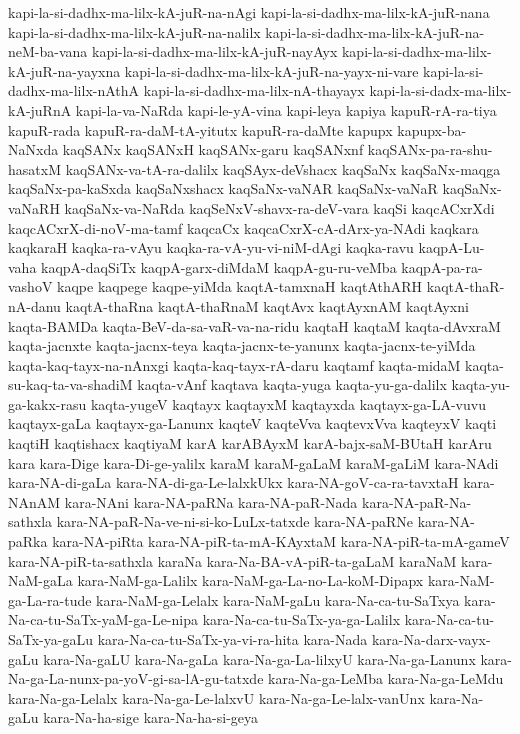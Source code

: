 {kapi-la-si-dadhx-ma-lilx-kA-juR-na-nAgi
kapi-la-si-dadhx-ma-lilx-kA-juR-nana
kapi-la-si-dadhx-ma-lilx-kA-juR-na-nalilx
kapi-la-si-dadhx-ma-lilx-kA-juR-na-neM-ba-vana
kapi-la-si-dadhx-ma-lilx-kA-juR-nayAyx
kapi-la-si-dadhx-ma-lilx-kA-juR-na-yayxna
kapi-la-si-dadhx-ma-lilx-kA-juR-na-yayx-ni-vare
kapi-la-si-dadhx-ma-lilx-nAthA
kapi-la-si-dadhx-ma-lilx-nA-thayayx
kapi-la-si-dadx-ma-lilx-kA-juRnA
kapi-la-va-NaRda
kapi-le-yA-vina
kapi-leya
kapiya
kapuR-rA-ra-tiya
kapuR-rada
kapuR-ra-daM-tA-yitutx
kapuR-ra-daMte
kapupx
kapupx-ba-NaNxda
kaqSANx
kaqSANxH
kaqSANx-garu
kaqSANxnf
kaqSANx-pa-ra-shu-hasatxM
kaqSANx-va-tA-ra-dalilx
kaqSAyx-deVshacx
kaqSaNx
kaqSaNx-maqga
kaqSaNx-pa-kaSxda
kaqSaNxshacx
kaqSaNx-vaNAR
kaqSaNx-vaNaR
kaqSaNx-vaNaRH
kaqSaNx-va-NaRda
kaqSeNxV-shavx-ra-deV-vara
kaqSi
kaqcACxrXdi
kaqcACxrX-di-noV-ma-tamf
kaqcaCx
kaqcaCxrX-cA-dArx-ya-NAdi
kaqkara
kaqkaraH
kaqka-ra-vAyu
kaqka-ra-vA-yu-vi-niM-dAgi
kaqka-ravu
kaqpA-Lu-vaha
kaqpA-daqSiTx
kaqpA-garx-diMdaM
kaqpA-gu-ru-veMba
kaqpA-pa-ra-vashoV
kaqpe
kaqpege
kaqpe-yiMda
kaqtA-tamxnaH
kaqtAthARH
kaqtA-thaR-nA-danu
kaqtA-thaRna
kaqtA-thaRnaM
kaqtAvx
kaqtAyxnAM
kaqtAyxni
kaqta-BAMDa
kaqta-BeV-da-sa-vaR-va-na-ridu
kaqtaH
kaqtaM
kaqta-dAvxraM
kaqta-jacnxte
kaqta-jacnx-teya
kaqta-jacnx-te-yanunx
kaqta-jacnx-te-yiMda
kaqta-kaq-tayx-na-nAnxgi
kaqta-kaq-tayx-rA-daru
kaqtamf
kaqta-midaM
kaqta-su-kaq-ta-va-shadiM
kaqta-vAnf
kaqtava
kaqta-yuga
kaqta-yu-ga-dalilx
kaqta-yu-ga-kakx-rasu
kaqta-yugeV
kaqtayx
kaqtayxM
kaqtayxda
kaqtayx-ga-LA-vuvu
kaqtayx-gaLa
kaqtayx-ga-Lanunx
kaqteV
kaqteVva
kaqtevxVva
kaqteyxV
kaqti
kaqtiH
kaqtishacx
kaqtiyaM
karA
karABAyxM
karA-bajx-saM-BUtaH
karAru
kara
kara-Dige
kara-Di-ge-yalilx
karaM
karaM-gaLaM
karaM-gaLiM
kara-NAdi
kara-NA-di-gaLa
kara-NA-di-ga-Le-lalxkUkx
kara-NA-goV-ca-ra-tavxtaH
kara-NAnAM
kara-NAni
kara-NA-paRNa
kara-NA-paR-Nada
kara-NA-paR-Na-sathxla
kara-NA-paR-Na-ve-ni-si-ko-LuLx-tatxde
kara-NA-paRNe
kara-NA-paRka
kara-NA-piRta
kara-NA-piR-ta-mA-KAyxtaM
kara-NA-piR-ta-mA-gameV
kara-NA-piR-ta-sathxla
karaNa
kara-Na-BA-vA-piR-ta-gaLaM
karaNaM
kara-NaM-gaLa
kara-NaM-ga-Lalilx
kara-NaM-ga-La-no-La-koM-Dipapx
kara-NaM-ga-La-ra-tude
kara-NaM-ga-Lelalx
kara-NaM-gaLu
kara-Na-ca-tu-SaTxya
kara-Na-ca-tu-SaTx-yaM-ga-Le-nipa
kara-Na-ca-tu-SaTx-ya-ga-Lalilx
kara-Na-ca-tu-SaTx-ya-gaLu
kara-Na-ca-tu-SaTx-ya-vi-ra-hita
kara-Nada
kara-Na-darx-vayx-gaLu
kara-Na-gaLU
kara-Na-gaLa
kara-Na-ga-La-lilxyU
kara-Na-ga-Lanunx
kara-Na-ga-La-nunx-pa-yoV-gi-sa-lA-gu-tatxde
kara-Na-ga-LeMba
kara-Na-ga-LeMdu
kara-Na-ga-Lelalx
kara-Na-ga-Le-lalxvU
kara-Na-ga-Le-lalx-vanUnx
kara-Na-gaLu
kara-Na-ha-sige
kara-Na-ha-si-geya
}
